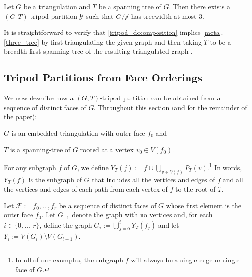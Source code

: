 \documentclass{patmorin}
\begin{document}
\begin{thm}\label{tripod_decomposition}
  Let $G$ be a triangulation and $T$ be a spanning tree of $G$.  Then there exists a $(G,T)$-tripod partition $\mathcal{Y}$ such that $G/\mathcal{Y}$ has treewidth at most $3$.
\end{thm}

It is straightforward to verify that \cref{tripod_decomposition} implies \cref{meta}.\ref{three_tree} by first triangulating the given graph and then taking $T$ to be a breadth-first spanning tree of the resulting triangulated graph \cite[Observation~35]{dujmovic.joret.ea:planar}.


\subsection{Tripod Partitions from Face Orderings}
\label{orderings}

We now describe how a $(G,T)$-tripod partition can be obtained from a sequence of distinct faces of $G$.  Throughout this section (and for the remainder of the paper):
\begin{compactitem}
   \item $G$ is an embedded triangulation with outer face $f_0$ and
   \item $T$ is a spanning-tree of $G$ rooted at a vertex $v_0\in V(f_0)$.
\end{compactitem}
For any subgraph $f$ of $G$, we define $Y_T(f):=f\cup \bigcup_{v\in V(f)} P_T(v)$.\footnote{In all of our examples, the subgraph $f$ will always be a single edge or single face of $G$.}  In words, $Y_T(f)$ is the subgraph of $G$ that includes all the vertices and edges of $f$ and all the vertices and edges of each path from each vertex of $f$ to the root of $T$.

Let $\mathcal{F}:=f_0,\ldots,f_{r}$ be a sequence of distinct faces of $G$  whose first element is the outer face $f_0$. Let $G_{-1}$ denote the graph with no vertices and, for each $i\in\{0,\ldots,r\}$, define the graph $G_i:=\bigcup_{j=0}^i Y_T(f_j)$ and let $Y_i:=V(G_i)\setminus V(G_{i-1})$. 
\end{document}
